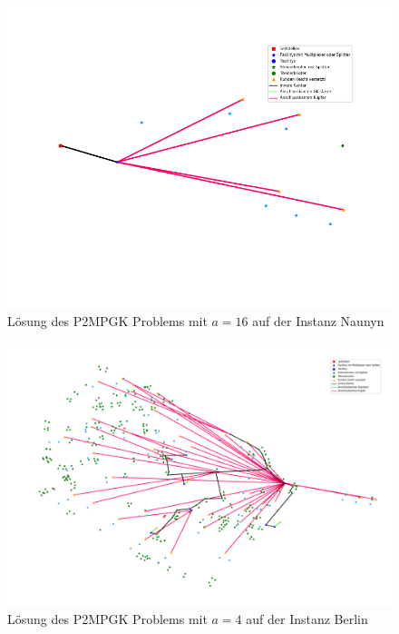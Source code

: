 \documentclass[11pt,a4paper]{article}
\theoremstyle{my_th_style1}
\begin{document}
\begin{figure}[!htbp]
	\begin{center}
		\begin{minipage}{8.0cm}
			\includegraphics[width=1\textwidth]{./Bilder/P2MPGK_Naunyn_demand1_duration0_SN16}
			\caption{L\"osung des P2MPGK Problems mit \(a = 16\) auf der Instanz Naunyn}
			\label{p2mpgk_n_pic_sn16}
		\end{minipage}
	\end{center}
\end{figure}

\begin{figure}[!htbp]
	\begin{center}
		\begin{minipage}{15.0cm}
			\includegraphics[width=1\textwidth]{./Bilder/P2MPGK_Berlin_demand1_duration0}
			\caption{L\"osung des P2MPGK Problems mit \(a = 4\) auf der Instanz Berlin}
			\label{p2mpgk_b_pic_sn4}
		\end{minipage}
	\end{center}
\end{figure}
\end{document}
